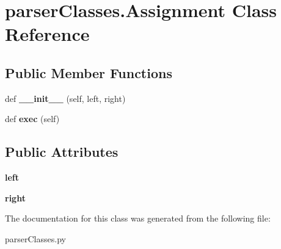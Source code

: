 \hypertarget{classparser_classes_1_1_assignment}{}\section{parser\+Classes.\+Assignment Class Reference}
\label{classparser_classes_1_1_assignment}
\subsection*{Public Member Functions}
\begin{DoxyCompactItemize}
\item 
def {\bfseries \+\_\+\+\_\+init\+\_\+\+\_\+} (self, left, right)\hypertarget{classparser_classes_1_1_assignment_a43da5ff93b04c80d9a466dcebd309d00}{}\label{classparser_classes_1_1_assignment_a43da5ff93b04c80d9a466dcebd309d00}

\item 
def {\bfseries exec} (self)\hypertarget{classparser_classes_1_1_assignment_a3c1e04ff93d19320677466afea6365bb}{}\label{classparser_classes_1_1_assignment_a3c1e04ff93d19320677466afea6365bb}

\end{DoxyCompactItemize}
\subsection*{Public Attributes}
\begin{DoxyCompactItemize}
\item 
{\bfseries left}\hypertarget{classparser_classes_1_1_assignment_ae986cc4a7cfecdaa4e3f63d14dbe88ef}{}\label{classparser_classes_1_1_assignment_ae986cc4a7cfecdaa4e3f63d14dbe88ef}

\item 
{\bfseries right}\hypertarget{classparser_classes_1_1_assignment_a422e2e0ef9731ceee7bc8ac30a226f1c}{}\label{classparser_classes_1_1_assignment_a422e2e0ef9731ceee7bc8ac30a226f1c}

\end{DoxyCompactItemize}


The documentation for this class was generated from the following file\+:\begin{DoxyCompactItemize}
\item 
parser\+Classes.\+py\end{DoxyCompactItemize}
